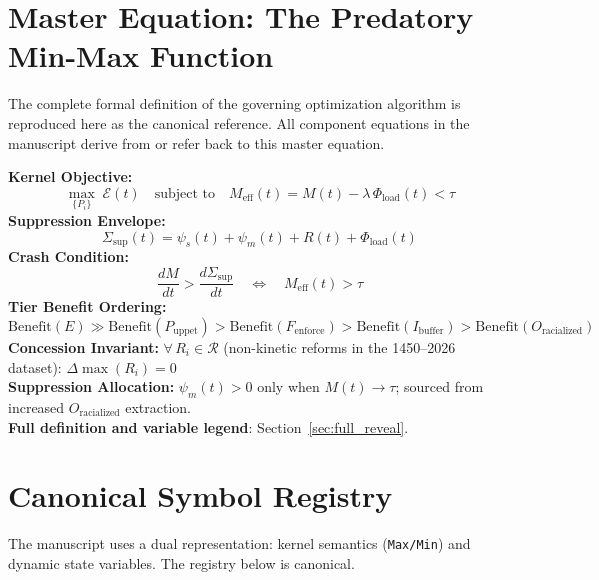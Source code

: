 \documentclass[12pt,openany]{book}
\begin{document}
\section{Master Equation: The Predatory Min-Max Function}

The complete formal definition of the governing optimization algorithm is reproduced here as the canonical reference. All component equations in the manuscript derive from or refer back to this master equation.

\begin{definition}
\textbf{Kernel Objective:}
\[
\max_{\{P_i\}}\; \mathcal{E}(t) \quad \text{subject to} \quad M_{\text{eff}}(t) = M(t) - \lambda\,\Phi_{\text{load}}(t) < \tau
\]
\textbf{Suppression Envelope:}
\[
\Sigma_{\text{sup}}(t) = \psi_s(t) + \psi_m(t) + R(t) + \Phi_{\text{load}}(t)
\]
\textbf{Crash Condition:}
\[
\frac{dM}{dt} > \frac{d\Sigma_{\text{sup}}}{dt} \quad \Longleftrightarrow \quad M_{\text{eff}}(t) > \tau
\]
\textbf{Tier Benefit Ordering:}
\[
\text{Benefit}(E) \gg \text{Benefit}(P_{\text{uppet}}) > \text{Benefit}(F_{\text{enforce}}) > \text{Benefit}(I_{\text{buffer}}) > \text{Benefit}(O_{\text{racialized}})
\]
\textbf{Concession Invariant:} $\forall\, R_i \in \mathcal{R}$ (non-kinetic reforms in the 1450--2026 dataset): $\Delta\max(R_i) = 0$\\
\textbf{Suppression Allocation:} $\psi_m(t) > 0$ only when $M(t) \to \tau$; sourced from increased $O_{\text{racialized}}$ extraction.\\
\textbf{Full definition and variable legend}: Section~\ref{sec:full_reveal}.
\end{definition}

\section{Canonical Symbol Registry}

The manuscript uses a dual representation: kernel semantics (\texttt{Max/Min}) and dynamic state variables. The registry below is canonical.
\end{document}
